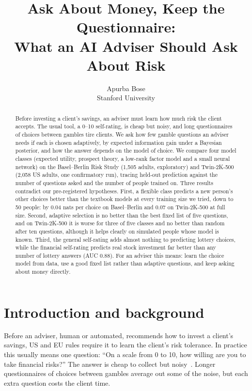 \documentclass{article}
\title{Ask About Money, Keep the Questionnaire:\\What an AI Adviser Should Ask About Risk}
\author{%
  Apurba Bose \\
  Stanford University \\
}
\begin{document}
\maketitle

\begin{abstract}
Before investing a client's savings, an adviser must learn how much risk the client accepts. The usual tool, a 0--10 self-rating, is cheap but noisy, and long questionnaires of choices between gambles tire clients. We ask how few gamble questions an adviser needs if each is chosen adaptively, by expected information gain under a Bayesian posterior, and how the answer depends on the model of choice. We compare four model classes (expected utility, prospect theory, a low-rank factor model and a small neural network) on the Basel--Berlin Risk Study (1,505 adults, exploratory) and Twin-2K-500 (2,058 US adults, one confirmatory run), tracing held-out prediction against the number of questions asked and the number of people trained on. Three results contradict our pre-registered hypotheses. First, a flexible class predicts a new person's other choices better than the textbook models at every training size we tried, down to 50 people: by 0.04 nats per choice on Basel--Berlin and 0.07 on Twin-2K-500 at full size. Second, adaptive selection is no better than the best fixed list of five questions, and on Twin-2K-500 it is worse for three of five classes and no better than random after ten questions, although it helps clearly on simulated people whose model is known. Third, the general self-rating adds almost nothing to predicting lottery choices, while the financial self-rating predicts real stock investment far better than any number of lottery answers (AUC 0.88). For an adviser this means: learn the choice model from data, use a good fixed list rather than adaptive questions, and keep asking about money directly.
\end{abstract}

\section{Introduction and background}

Before an adviser, human or automated, recommends how to invest a client's savings, US and EU rules require it to learn the client's risk tolerance. In practice this usually means one question: ``On a scale from 0 to 10, how willing are you to take financial risks?'' The answer is cheap to collect but noisy~\citep{frey2017}. Longer questionnaires of choices between gambles average out some of the noise, but each extra question costs the client time.
\end{document}

